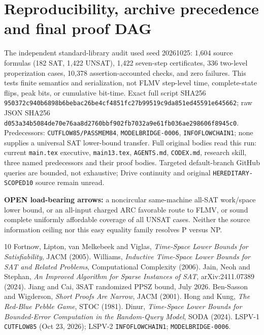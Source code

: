 \documentclass[11pt]{article}
\begin{document}
\section{Reproducibility, archive precedence and final proof DAG}
The independent standard-library audit used seed 20261025: 1,604 source formulas (182 SAT, 1,422 UNSAT), 1,422 seven-step certificates, 336 two-level properization cases, 10,378 assertion-accounted checks, and zero failures. This tests finite semantics and serialization, not FLMV step-level time, complete-state flips, peak bits, or cumulative bit-time. Exact full script SHA256 \texttt{950372c940b6898b6bebac26be4cf4851fc27b99519c9da851ed45591e645662}; raw JSON SHA256 \texttt{d053a34b5084de70e76aa8d2760bbf902fb7032a9e61fb036ae298606f8945c0}.
Predecessors: \texttt{CUTFLOW85/PASSMEM84}, \texttt{MODELBRIDGE-0006}, \texttt{INFOFLOWCHAIN1}; none supplies a universal SAT lower-bound transfer. Full original bodies read this run: current \texttt{main.tex} executive, \texttt{main13.tex}, \texttt{AGENTS.md}, \texttt{CODEX.md}, research skill, three named predecessors and their proof bodies. Targeted default-branch GitHub queries are bounded, not exhaustive; Drive continuity and original \texttt{HEREDITARY-SCOPED10} source remain unread.
\par\noindent \textbf{OPEN load-bearing arrows:} a noncircular same-machine all-SAT work/space lower bound, or an all-input charged ARC favorable route to FLMV, or sound complete uniformly affordable coverage of all UNSAT cases. Neither the source information ceiling nor this easy equality family resolves P versus NP. 
\begin{thebibliography}{10}
 Fortnow, Lipton, van Melkebeek and Viglas, \emph{Time-Space Lower Bounds for Satisfiability}, JACM (2005).
 Williams, \emph{Inductive Time-Space Lower Bounds for SAT and Related Problems}, Computational Complexity (2006).
 Jain, Neoh and Stephan, \emph{An Improved Algorithm for Sparse Instances of SAT}, arXiv:2411.07389 (2024).
 Jiang and Cai, 3SAT randomized PPSZ bound, July 2026.
 Ben-Sasson and Wigderson, \emph{Short Proofs Are Narrow}, JACM (2001).
 Hong and Kung, \emph{The Red-Blue Pebble Game}, STOC (1981).
 Dinur, \emph{Time-Space Lower Bounds for Bounded-Error Computation in the Random-Query Model}, SODA (2024).
 LSPV-1 \texttt{CUTFLOW85} (Oct 23, 2026); LSPV-2 \texttt{INFOFLOWCHAIN1}; \texttt{MODELBRIDGE-0006}.
\end{thebibliography}
\end{document}
